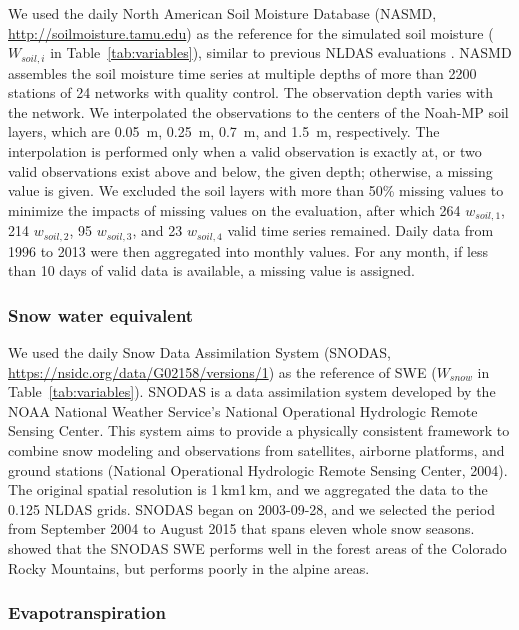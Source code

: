 \documentclass[essd, manuscript]{copernicus}
\begin{document}
We used the daily North American Soil Moisture Database (NASMD, \url{http://soilmoisture.tamu.edu}) \citep{quiring2016BAMS} as the reference for the simulated soil moisture (\(W_{soil,i}\) in Table~\ref{tab:variables}), similar to previous NLDAS evaluations \citep{xia2015JHa, xia2015JH}. NASMD assembles the soil moisture time series at multiple depths of more than 2200 stations of 24 networks with quality control. The observation depth varies with the network. We interpolated the observations to the centers of the Noah-MP soil layers, which are \qty{0.05}{m}, \qty{0.25}{m}, \qty{0.7}{m}, and \qty{1.5}{m}, respectively. The interpolation is performed only when a valid observation is exactly at, or two valid observations exist above and below, the given depth; otherwise, a missing value is given. We excluded the soil layers with more than 50\% missing values to minimize the impacts of missing values on the evaluation, after which 264 \(w_{soil,1}\), 214 \(w_{soil,2}\), 95 \(w_{soil,3}\), and 23 \(w_{soil,4}\) valid time series remained. Daily data from 1996 to 2013 were then aggregated into monthly values. For any month, if less than 10 days of valid data is available, a missing value is assigned.

\subsubsection{Snow water equivalent}

We used the daily Snow Data Assimilation System (SNODAS, \url{https://nsidc.org/data/G02158/versions/1}) as the reference of SWE (\(W_{snow}\) in Table~\ref{tab:variables}). SNODAS is a data assimilation system developed by the NOAA National Weather Service's National Operational Hydrologic Remote Sensing Center. This system aims to provide a physically consistent framework to combine snow modeling and observations from satellites, airborne platforms, and ground stations (National Operational Hydrologic Remote Sensing Center, 2004). The original spatial resolution is 1\,km\times{}1\,km, and we aggregated the data to the 0.125\degree{} NLDAS grids. SNODAS began on 2003-09-28, and we selected the period from September 2004 to August 2015 that spans eleven whole snow seasons. \citet{clow2012HP} showed that the SNODAS SWE performs well in the forest areas of the Colorado Rocky Mountains, but performs poorly in the alpine areas.

\subsubsection{Evapotranspiration}\label{sec:methods:ref:et}
\end{document}
